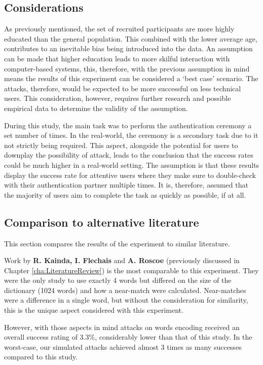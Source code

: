 \subsection*{Considerations}
As previously mentioned, the set of recruited participants are more highly educated than the general population. This combined with the lower average age, contributes to an inevitable bias being introduced into the data. An assumption can be made that higher education leads to more skilful interaction with computer-based systems, this, therefore, with the previous assumption in mind means the results of this experiment can be considered a `best case' scenario. The attacks, therefore, would be expected to be more successful on less technical users. This consideration, however, requires further research and possible empirical data to determine the validity of the assumption. 

During this study, the main task was to perform the authentication ceremony a set number of times. In the real-world, the ceremony is a secondary task due to it not strictly being required. This aspect, alongside the potential for users to downplay the possibility of attack, leads to the conclusion that the success rates could be much higher in a real-world setting. The assumption is that these results display the success rate for attentive users where they make sure to double-check with their authentication partner multiple times. It is, therefore, assumed that the majority of users aim to complete the task as quickly as possible, if at all.

\subsection*{Comparison to alternative literature}
This section compares the results of the experiment to similar literature.

Work by \textbf{R. Kainda, I. Flechais} and \textbf{A. Roscoe}\cite{kainda2009usability} (previously discussed in Chapter \ref{cha:LiteratureReview}) is the most comparable to this experiment. They were the only study to use exactly 4 words but differed on the size of the dictionary (1024 words) and how a near-match were calculated. Near-matches were a difference in a single word, but without the consideration for similarity, this is the unique aspect considered with this experiment.

However, with those aspects in mind attacks on words encoding received an overall success rating of 3.3\%, considerably lower than that of this study. In the worst-case, our simulated attacks achieved almost 3 times as many successes compared to this study.

